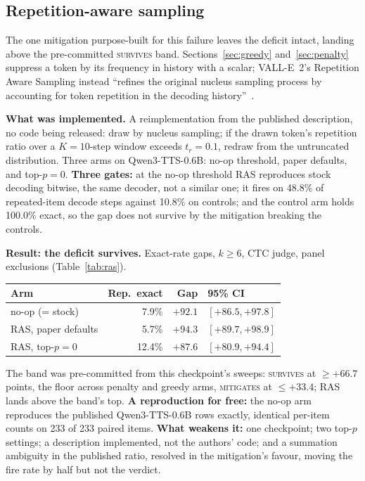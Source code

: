 \subsection{Repetition-aware sampling}
\label{sec:ras}

The one mitigation purpose-built for this failure leaves the deficit intact, landing above the
pre-committed \textsc{survives} band. Sections~\ref{sec:greedy} and~\ref{sec:penalty} suppress a
token by its frequency in history with a scalar; VALL-E~2's Repetition Aware Sampling instead
``refines the original nucleus sampling process by accounting for token repetition in the
decoding history''~\cite{chen2024valle2}.

\noindent\textbf{What was implemented.} A reimplementation from the published description, no
code being released: draw by nucleus sampling; if the drawn token's repetition ratio over a
$K{=}10$-step window exceeds $t_r{=}0.1$, redraw from the untruncated distribution. Three arms
on Qwen3-TTS-0.6B: no-op threshold, paper defaults, and top-$p{=}0$. \textbf{Three gates:} at
the no-op threshold RAS reproduces stock decoding bitwise, the same decoder, not a similar one;
it fires on 48.8\% of repeated-item decode steps against 10.8\% on controls; and the control
arm holds 100.0\% exact, so the gap does not survive by the mitigation breaking the controls.

\noindent\textbf{Result: the deficit survives.} Exact-rate gaps, $k\ge6$, CTC judge, panel
exclusions (Table~\ref{tab:ras}).

\par\medskip\noindent\begin{minipage}{\columnwidth}
\label{tab:ras}
\centering
\begin{tabular}{@{}lrrl@{}}
\toprule
Arm & Rep.\ exact & Gap & 95\% CI \\
\midrule
no-op (= stock)          & 7.9\%  & $+92.1$ & $[+86.5, +97.8]$ \\
RAS, paper defaults      & 5.7\%  & $+94.3$ & $[+89.7, +98.9]$ \\
RAS, $\text{top-}p{=}0$  & 12.4\% & $+87.6$ & $[+80.9, +94.4]$ \\
\bottomrule
\end{tabular}
\end{minipage}\par\medskip


\noindent The band was pre-committed from this checkpoint's sweeps: \textsc{survives} at
$\ge +66.7$ points, the floor across penalty and greedy arms, \textsc{mitigates} at
$\le +33.4$; RAS lands above the band's top. \textbf{A reproduction for free:} the no-op arm
reproduces the published Qwen3-TTS-0.6B rows exactly, identical per-item counts on 233 of 233
paired items. \textbf{What weakens it:} one checkpoint; two top-$p$ settings; a description
implemented, not the authors' code; and a summation ambiguity in the published ratio, resolved
in the mitigation's favour, moving the fire rate by half but not the verdict.

